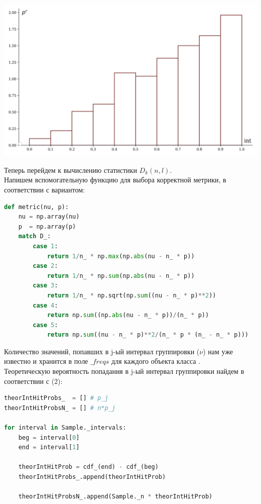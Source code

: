 \documentclass[a4paper, 14pt]{extarticle}
\begin{document}
\begin{minipage}[t]{0.25\textwidth}
\includegraphics[width=\textwidth, height=\textheight, keepaspectratio]{sample36_hist}
\end{minipage}

\newpage{}

Теперь перейдем к вычислению статистики $D_k(n, l)$.\\

Напишем вспомогательную функцию для выбора корректной метрики, в соответствии с вариантом:
\begin{center}
  \begin{lstlisting}[language=Python]
def metric(nu, p):
    nu = np.array(nu)
    p  = np.array(p)
    match D_:
        case 1:
            return 1/n_ * np.max(np.abs(nu - n_ * p))
        case 2:
            return 1/n_ * np.sum(np.abs(nu - n_ * p))
        case 3:
            return 1/n_ * np.sqrt(np.sum((nu - n_ * p)**2))
        case 4:
            return np.sum((np.abs(nu - n_ * p))/(n_ * p))
        case 5:
            return np.sum((nu - n_ * p)**2/(n_ * p * (n_ - n_ * p)))
  \end{lstlisting}
\end{center}

Количество значений, попавших в j-ый интервал группировки ($\nu$) нам уже известно и 
хранится в поле $\_freqs$ для каждого объекта класса . \\

Теоретическую вероятность попадания в j-ый интервал группировки найдем в соответствии с 
(2):

\begin{center}
  \begin{lstlisting}[language=Python]
theorIntHitProbs_  = [] # p_j
theorIntHitProbsN_ = [] # n*p_j

for interval in Sample._intervals:
    beg = interval[0]
    end = interval[1]

    theorIntHitProb = cdf_(end) - cdf_(beg)
    theorIntHitProbs_.append(theorIntHitProb)

    theorIntHitProbsN_.append(Sample._n * theorIntHitProb)
  \end{lstlisting}
\end{center}
\end{document}
